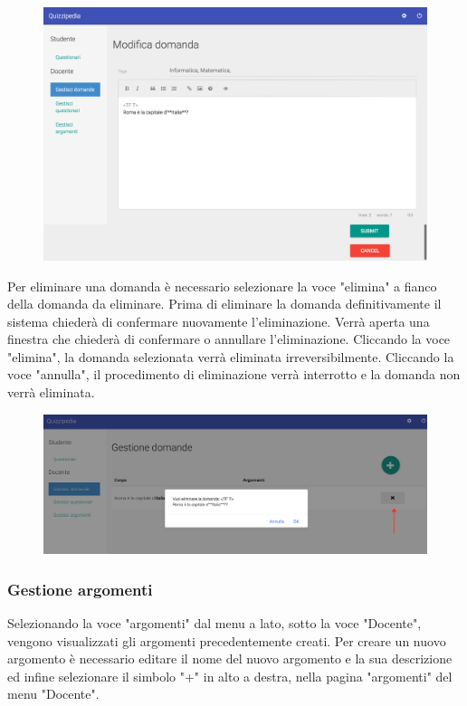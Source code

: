 \documentclass[12pt,a4paper]{article}
\begin{document}
		\begin{figure}[H]	
			\centering
			\includegraphics[width=0.5\linewidth]{../img/screenshot/modificaDomanda.png}
			\caption{}
			\label{Modifica domanda}
		\end{figure}
	
	Per eliminare una domanda è necessario selezionare la voce "elimina" a fianco della domanda da eliminare. Prima di eliminare la domanda definitivamente il sistema chiederà di confermare nuovamente l'eliminazione.
	Verrà aperta una finestra che chiederà di confermare o annullare l'eliminazione. Cliccando la voce "elimina", la domanda selezionata verrà eliminata irreversibilmente. Cliccando la voce "annulla", il procedimento di eliminazione verrà interrotto e la domanda non verrà eliminata.
	
	\begin{figure}[H]	
		\centering
		\includegraphics[width=1.0\linewidth]{../img/screenshot/eliminaDomanda.png}
		\caption{}
		\label{Elimina domanda}
	\end{figure}
		
	\subsubsection{Gestione argomenti}
	Selezionando la voce "argomenti" dal menu a lato, sotto la voce "Docente", vengono visualizzati gli argomenti precedentemente creati.
		Per creare un nuovo argomento è necessario editare il nome del nuovo argomento e la sua descrizione ed infine selezionare il simbolo "+" in alto a destra, nella pagina "argomenti" del menu "Docente".
		
\end{document}
